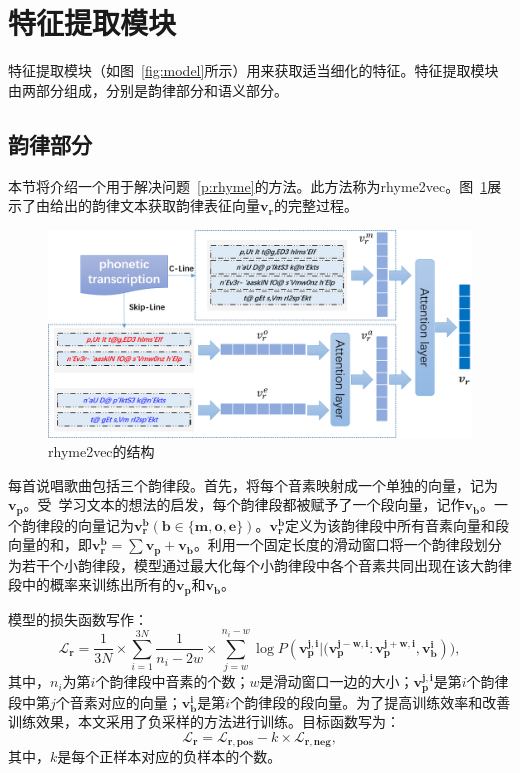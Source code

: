 \section{特征提取模块} \label{sec:fe}
特征提取模块（如图~\ref{fig:model}所示）用来获取适当细化的特征。特征提取模块由两部分组成，分别是韵律部分和语义部分。\par

\subsection{韵律部分}
本节将介绍一个用于解决问题~\ref{p:rhyme}的方法。此方法称为rhyme2vec。图~\ref{fig:rhyme2vec}展示了由给出的韵律文本获取韵律表征向量$\bm {v_r}$的完整过程。\par

\begin{figure}[h]
  \centering
  \includegraphics[width=1\textwidth]{rhyme.png}
  \caption{rhyme2vec的结构}
  \label{fig:rhyme2vec}
\end{figure}
每首说唱歌曲包括三个韵律段。首先，将每个音素映射成一个单独的向量，记为$\bm{v_p}$。受~\autocite{quoc2014distributed}学习文本的想法的启发，每个韵律段都被赋予了一个段向量，记作$\bm {v_b}$。一个韵律段的向量记为$\bm {v_r^b} (\bm b \in \{\bm{m, o, e}\})$。$\bm {v_r^b}$定义为该韵律段中所有音素向量和段向量的和，即$\bm {v_r^b}=\sum\bm{v_{p}}+\bm{v_b}$。利用一个固定长度的滑动窗口将一个韵律段划分为若干个小韵律段，模型通过最大化每个小韵律段中各个音素共同出现在该大韵律段中的概率来训练出所有的$\bm {v_p}$和$\bm{v_b}$。\par

模型的损失函数写作：
\begin{equation}
\mathcal L_{\bm r} =\frac{1}{3N}\times \sum_{i=1}^{3N}\frac{1}{{n_i}-2w}\times \sum\limits_{j=w}^{n_i-w}\log P(\bm {v_p^{j,i}}|\bm {(v_p^{j-w,i}}: \bm {v_p^{j+w,i}}, \bm {v_b^{i}})),
\end{equation}
其中，$n_i$为第$i$个韵律段中音素的个数；$w$是滑动窗口一边的大小；$\bm {v_p^{j, i}}$是第$i$个韵律段中第$j$个音素对应的向量；$\bm {v_b^{i}}$是第$i$个韵律段的段向量。为了提高训练效率和改善训练效果，本文采用了负采样的方法进行训练。目标函数写为：
\begin{equation}
\bm{\mathcal{L}_r}=\bm{\mathcal{L}_{r,pos}}- k \times \bm{\mathcal{L}_{r,neg}},
\end{equation}
其中，$k$是每个正样本对应的负样本的个数。\par

